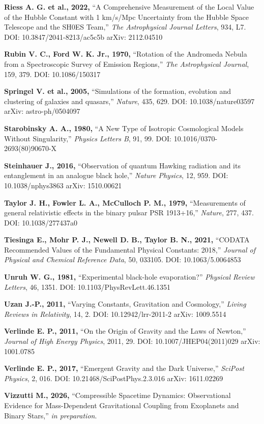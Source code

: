 \documentclass[11pt,a4paper]{article}
\begin{document}
\textbf{Riess A. G. et al., 2022,} ``A Comprehensive Measurement of the
Local Value of the Hubble Constant with 1 km/s/Mpc Uncertainty from the
Hubble Space Telescope and the SH0ES Team,'' \emph{The Astrophysical
Journal Letters}, 934, L7. DOI: 10.3847/2041-8213/ac5c5b arXiv:
2112.04510

\textbf{Rubin V. C., Ford W. K. Jr., 1970,} ``Rotation of the Andromeda
Nebula from a Spectroscopic Survey of Emission Regions,'' \emph{The
Astrophysical Journal}, 159, 379. DOI: 10.1086/150317

\textbf{Springel V. et al., 2005,} ``Simulations of the formation,
evolution and clustering of galaxies and quasars,'' \emph{Nature}, 435,
629. DOI: 10.1038/nature03597 arXiv: astro-ph/0504097

\textbf{Starobinsky A. A., 1980,} ``A New Type of Isotropic Cosmological
Models Without Singularity,'' \emph{Physics Letters B}, 91, 99. DOI:
10.1016/0370-2693(80)90670-X

\textbf{Steinhauer J., 2016,} ``Observation of quantum Hawking radiation
and its entanglement in an analogue black hole,'' \emph{Nature Physics},
12, 959. DOI: 10.1038/nphys3863 arXiv: 1510.00621

\textbf{Taylor J. H., Fowler L. A., McCulloch P. M., 1979,}
``Measurements of general relativistic effects in the binary pulsar PSR
1913+16,'' \emph{Nature}, 277, 437. DOI: 10.1038/277437a0

\textbf{Tiesinga E., Mohr P. J., Newell D. B., Taylor B. N., 2021,}
``CODATA Recommended Values of the Fundamental Physical Constants:
2018,'' \emph{Journal of Physical and Chemical Reference Data}, 50,
033105. DOI: 10.1063/5.0064853

\textbf{Unruh W. G., 1981,} ``Experimental black-hole evaporation?''
\emph{Physical Review Letters}, 46, 1351. DOI:
10.1103/PhysRevLett.46.1351

\textbf{Uzan J.-P., 2011,} ``Varying Constants, Gravitation and
Cosmology,'' \emph{Living Reviews in Relativity}, 14, 2. DOI:
10.12942/lrr-2011-2 arXiv: 1009.5514

\textbf{Verlinde E. P., 2011,} ``On the Origin of Gravity and the Laws
of Newton,'' \emph{Journal of High Energy Physics}, 2011, 29. DOI:
10.1007/JHEP04(2011)029 arXiv: 1001.0785

\textbf{Verlinde E. P., 2017,} ``Emergent Gravity and the Dark
Universe,'' \emph{SciPost Physics}, 2, 016. DOI:
10.21468/SciPostPhys.2.3.016 arXiv: 1611.02269

\textbf{Vizzutti M., 2026,} ``Compressible Spacetime
Dynamics: Observational Evidence for Mass-Dependent Gravitational
Coupling from Exoplanets and Binary Stars,'' \emph{in preparation}.
\end{document}
